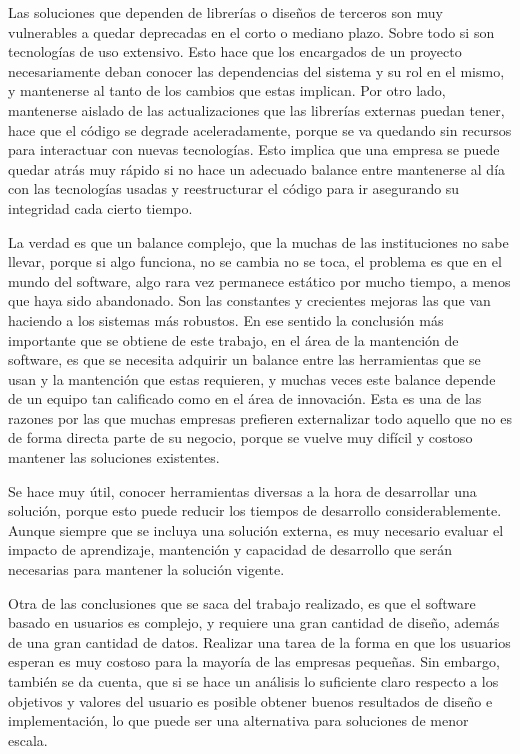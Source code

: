 \par Las soluciones que dependen de librerías o diseños de terceros son muy vulnerables a quedar deprecadas en el corto o mediano plazo. Sobre todo si son tecnologías de uso extensivo. Esto hace que los encargados de un proyecto necesariamente deban conocer las dependencias del sistema y su rol en el mismo, y mantenerse al tanto de los cambios que estas implican. Por otro lado, mantenerse aislado de las actualizaciones que las librerías externas puedan tener, hace que el código se degrade aceleradamente, porque se va quedando sin recursos para interactuar con nuevas tecnologías. Esto implica que una empresa se puede quedar atrás muy rápido si no hace un adecuado balance entre mantenerse al día con las tecnologías usadas y reestructurar el código para ir asegurando su integridad cada cierto tiempo.
\par La verdad es que un balance complejo, que la muchas de las instituciones no sabe llevar, porque si algo funciona, no se cambia no se toca, el problema es que en el mundo del software, algo rara vez permanece estático por mucho tiempo, a menos que haya sido abandonado. Son las constantes y crecientes mejoras las que van haciendo a los sistemas más robustos. En ese sentido la conclusión más importante que se obtiene de este trabajo, en el área de la mantención de software, es que se necesita adquirir un balance entre las herramientas que se usan y la mantención que estas requieren, y muchas veces este balance depende de un equipo tan calificado como en el área de innovación. Esta es una de las razones por las que muchas empresas prefieren externalizar todo aquello que no es de forma directa parte de su negocio, porque se vuelve muy difícil y costoso mantener las soluciones existentes.

\par Se hace muy útil, conocer herramientas diversas a la hora de desarrollar una solución, porque esto puede reducir los tiempos de desarrollo considerablemente. Aunque siempre que se incluya una solución externa, es muy necesario evaluar el impacto de aprendizaje, mantención y capacidad de desarrollo que serán necesarias para mantener la solución vigente.

\par Otra de las conclusiones que se saca del trabajo realizado, es que el software basado en usuarios es complejo, y requiere una gran cantidad de diseño, además de una gran cantidad de datos. Realizar una tarea de la forma en que los usuarios esperan es muy costoso para la mayoría de las empresas pequeñas. Sin embargo, también se da cuenta, que si se hace un análisis lo suficiente claro respecto a los objetivos y valores del usuario es posible obtener buenos resultados de diseño e implementación, lo que puede ser una alternativa para soluciones de menor escala.


